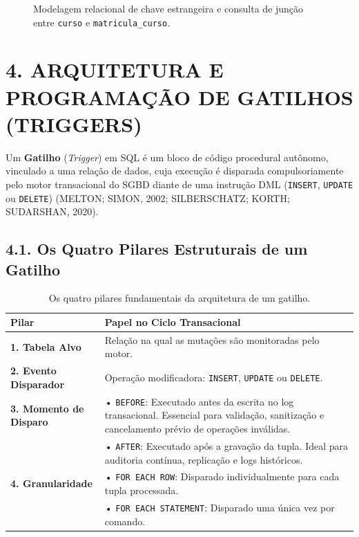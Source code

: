 \begin{figure}[htbp]
\caption{Modelagem relacional de chave estrangeira e consulta de junção entre \texttt{curso} e \texttt{matricula\_curso}.}
\label{fig:fk_curso_matricula}
\end{figure}

\newpage

\section*{4. ARQUITETURA E PROGRAMAÇÃO DE GATILHOS (TRIGGERS)}

Um \textbf{Gatilho} (\textit{Trigger}) em SQL é um bloco de código procedural autônomo, vinculado a uma relação de dados, cuja execução é disparada compulsoriamente pelo motor transacional do SGBD diante de uma instrução DML (\texttt{INSERT}, \texttt{UPDATE} ou \texttt{DELETE}) (MELTON; SIMON, 2002; SILBERSCHATZ; KORTH; SUDARSHAN, 2020).

\subsection*{4.1. Os Quatro Pilares Estruturais de um Gatilho}

\begin{table}[h!]
\centering
\small
\begin{tabular}{|l|p{10cm}|}
\hline
\textbf{Pilar} & \textbf{Papel no Ciclo Transacional} \\ \hline
\textbf{1. Tabela Alvo} & Relação na qual as mutações são monitoradas pelo motor. \\ \hline
\textbf{2. Evento Disparador} & Operação modificadora: \texttt{INSERT}, \texttt{UPDATE} ou \texttt{DELETE}. \\ \hline
\textbf{3. Momento de Disparo} & • \texttt{BEFORE}: Executado antes da escrita no log transacional. Essencial para validação, sanitização e cancelamento prévio de operações inválidas.\\
 & • \texttt{AFTER}: Executado após a gravação da tupla. Ideal para auditoria contínua, replicação e logs históricos. \\ \hline
\textbf{4. Granularidade} & • \texttt{FOR EACH ROW}: Disparado individualmente para cada tupla processada.\\
 & • \texttt{FOR EACH STATEMENT}: Disparado uma única vez por comando. \\ \hline
\end{tabular}
\caption{Os quatro pilares fundamentais da arquitetura de um gatilho.}
\end{table}

